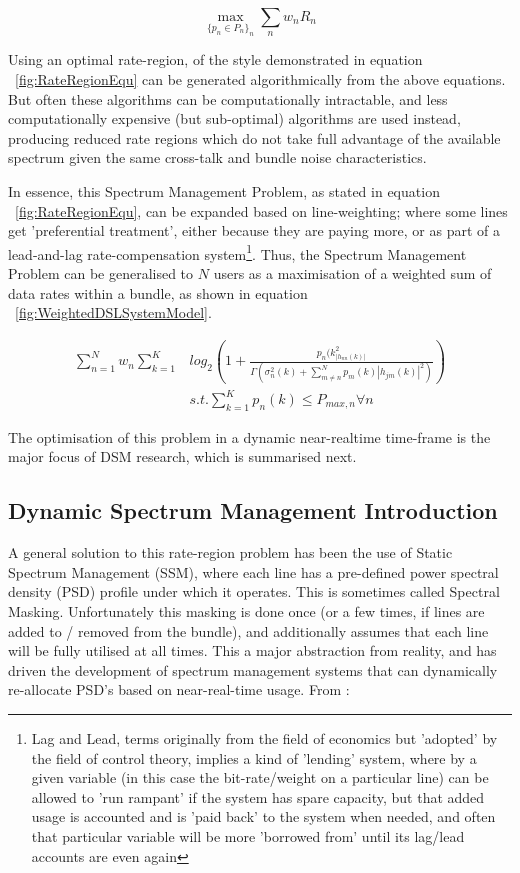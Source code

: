 \begin{equation}\label{fig:RateRegionEqu}
\max\limits_{\{p_n\in P_n\}_n} \sum_n w_n R_n
\end{equation}

Using an optimal rate-region, of the style demonstrated in equation ~\ref{fig:RateRegionEqu} can be generated algorithmically from the above equations. But often these algorithms can be computationally intractable, and less computationally expensive (but sub-optimal) algorithms are used instead, producing reduced rate regions which do not take full advantage of the available spectrum given the same cross-talk and bundle noise characteristics.

In essence, this Spectrum Management Problem, as stated in equation ~\eqref{fig:RateRegionEqu}, can be expanded based on line-weighting; where some lines get 'preferential treatment', either because they are paying more, or as part of a lead-and-lag rate-compensation system\footnote{Lag and Lead, terms originally from the field of economics but 'adopted' by the field of control theory, implies a kind of 'lending' system, where by a given variable (in this case the bit-rate/weight on a particular line) can be allowed to 'run rampant' if the system has spare capacity, but that added usage is accounted and is 'paid back' to the system when needed, and often that particular variable will be more 'borrowed from' until its lag/lead accounts are even again}. Thus, the Spectrum Management Problem can be generalised to \(N\) users as a maximisation of a weighted sum of data rates within a bundle, as shown in equation ~\eqref{fig:WeightedDSLSystemModel}.

\begin{equation}\label{fig:WeightedDSLSystemModel}
\begin{array}{rc}
\sum\limits_{n=1}^N w_n \sum\limits_{k=1}^K & log_2 \left(1+\frac{p_n(k_|h_{nn}(k)|^2}{\Gamma\left(\sigma_n^2(k)+\sum\limits_{m\neq n}^N p_m(k)|h_{jm}(k)|^2\right)}\right)\\
 &s.t.\sum_{k=1}^Kp_n(k) \leq P_{max,n} \forall n
\end{array}
\end{equation}

The optimisation of this problem in a dynamic near-realtime time-frame is the major focus of DSM research, which is summarised next.


\subsection{Dynamic Spectrum Management Introduction}
A general solution to this rate-region problem has been the use of Static Spectrum Management (SSM), where each line has a pre-defined power spectral density (PSD) profile under which it operates. This is sometimes called Spectral Masking. Unfortunately this masking is done once (or a few times, if lines are added to / removed from the bundle), and additionally assumes that each line will be fully utilised at all times. This a major abstraction from reality, and has driven the development of spectrum management systems that can dynamically re-allocate PSD's based on near-real-time usage. From \cite{STC07}:

